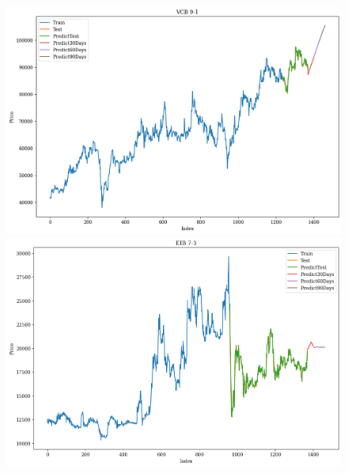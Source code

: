 \begin{figure}[H]
\begin{minipage}{0.15\textwidth}
    \end{minipage}
    \hfill
        \begin{minipage}{0.15\textwidth}
    \centering
    \includegraphics[width=1\textwidth]{resources/chapter-5/newdata1/result/VCB_N-HiTS_9-1.png}
    \end{minipage}
    \hfill
    \begin{minipage}{0.15\textwidth}
    \centering
    \includegraphics[width=1\textwidth]{resources/chapter-5/newdata1/result/EIB_N-HiTS_7-3.png}
    \end{minipage}
    \hfill
    \begin{minipage}{0.15\textwidth}
    \centering

\end{minipage}
\end{figure}
